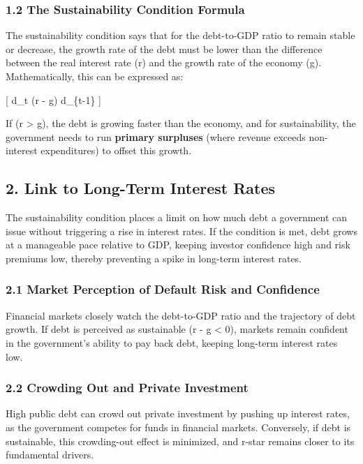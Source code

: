\documentclass[
  letterpaper,
  DIV=11,
  numbers=noendperiod]{scrartcl}
\begin{document}
\subsubsection{1.2 The Sustainability Condition
Formula}\label{the-sustainability-condition-formula}

The sustainability condition says that for the debt-to-GDP ratio to
remain stable or decrease, the growth rate of the debt must be lower
than the difference between the real interest rate (r) and the growth
rate of the economy (g). Mathematically, this can be expressed as:

{[} \Delta d\_t \leq (r - g) d\_\{t-1\} {]}

If (r \textgreater{} g), the debt is growing faster than the economy,
and for sustainability, the government needs to run \textbf{primary
surpluses} (where revenue exceeds non-interest expenditures) to offset
this growth.

\subsection{2. Link to Long-Term Interest
Rates}\label{link-to-long-term-interest-rates}

The sustainability condition places a limit on how much debt a
government can issue without triggering a rise in interest rates. If the
condition is met, debt grows at a manageable pace relative to GDP,
keeping investor confidence high and risk premiums low, thereby
preventing a spike in long-term interest rates.

\subsubsection{2.1 Market Perception of Default Risk and
Confidence}\label{market-perception-of-default-risk-and-confidence}

Financial markets closely watch the debt-to-GDP ratio and the trajectory
of debt growth. If debt is perceived as sustainable (r - g \textless{}
0), markets remain confident in the government's ability to pay back
debt, keeping long-term interest rates low.

\subsubsection{2.2 Crowding Out and Private
Investment}\label{crowding-out-and-private-investment}

High public debt can crowd out private investment by pushing up interest
rates, as the government competes for funds in financial markets.
Conversely, if debt is sustainable, this crowding-out effect is
minimized, and r-star remains closer to its fundamental drivers.
\end{document}
